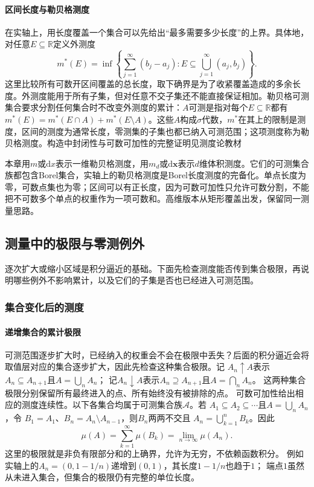 \paragraph{区间长度与勒贝格测度}

在实轴上，用长度覆盖一个集合可以先给出“最多需要多少长度”的上界。具体地，对任意$E\subseteq\mathbb R$定义外测度
\[
 m^*(E)=\inf\left\{\sum_{j=1}^{\infty}(b_j-a_j):
 E\subseteq\bigcup_{j=1}^{\infty}(a_j,b_j)\right\}.
\]
这里比较所有可数开区间覆盖的总长度，取下确界是为了收紧覆盖造成的多余长度。外测度能用于所有子集，但对任意不交子集还不能直接保证相加。勒贝格可测集合要求分割任何集合时不改变外测度的累计：$A$可测是指对每个$E\subseteq\mathbb R$都有
$m^*(E)=m^*(E\cap A)+m^*(E\setminus A)$。这些$A$构成$\sigma$代数，$m^*$在其上的限制是测度，区间的测度为通常长度，零测集的子集也都已纳入可测范围；这项测度称为勒贝格测度。构造中封闭性与可数可加性的完整证明见测度论教材

本章用$m$或$\mathrm dx$表示一维勒贝格测度，用$m_d$或$\mathrm d\bm x$表示$d$维体积测度。它们的可测集合族都包含Borel集合，实轴上的勒贝格测度是Borel长度测度的完备化。单点长度为零，可数点集也为零；区间可以有正长度，因为可数可加性只允许可数分割，不能把不可数多个单点的权重作为一项可数和。高维版本从矩形覆盖出发，保留同一测量思路。

\subsection{测量中的极限与零测例外}

逐次扩大或缩小区域是积分逼近的基础。下面先检查测度能否传到集合极限，再说明哪些例外不影响累计，以及它们的子集是否也已经进入可测范围。

\subsubsection{集合变化后的测度}
\label{sec:analysis-set-measure-continuity}
\paragraph{递增集合的累计极限}

可测范围逐步扩大时，已经纳入的权重会不会在极限中丢失？后面的积分逼近会将取值层对应的集合逐步扩大，因此先检查这种集合极限。记
$A_n\uparrow A$表示$A_n\subseteq A_{n+1}$且$A=\bigcup_nA_n$；
记$A_n\downarrow A$表示$A_n\supseteq A_{n+1}$且$A=\bigcap_nA_n$。
这两种集合极限分别保留所有最终进入的点、所有始终没有被排除的点。
可数可加性给出相应的测度连续性。以下各集合均属于可测集合族$\mathcal A$。若
$A_1\subseteq A_2\subseteq\cdots$且$A=\bigcup_nA_n$，令
$B_1=A_1$、$B_n=A_n\setminus A_{n-1}$，则$B_n$两两不交且
$A_n=\bigcup_{k=1}^nB_k$。因此
\[
  \mu(A)
  =
  \sum_{k=1}^{\infty}\mu(B_k)
  =
  \lim_{n\to\infty}\mu(A_n).
\]
这里的极限就是非负有限部分和的上确界，允许为无穷，不依赖函数积分。
例如实轴上的$A_n=(0,1-1/n)$递增到$(0,1)$，其长度$1-1/n$也趋于$1$；
端点$1$虽然从未进入集合，但集合的极限仍有完整的单位长度。

